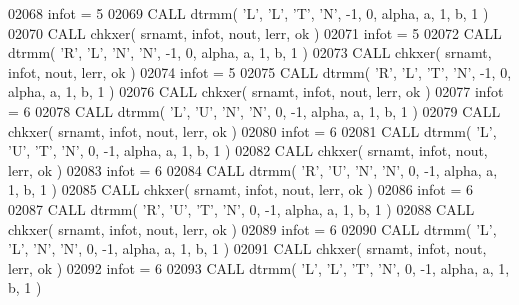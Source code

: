 \begin{DoxyCode}
02068       infot = 5
02069       \textcolor{keyword}{CALL }dtrmm( \textcolor{stringliteral}{'L'}, \textcolor{stringliteral}{'L'}, \textcolor{stringliteral}{'T'}, \textcolor{stringliteral}{'N'}, -1, 0, alpha, a, 1, b, 1 )
02070       \textcolor{keyword}{CALL }chkxer( srnamt, infot, nout, lerr, ok )
02071       infot = 5
02072       \textcolor{keyword}{CALL }dtrmm( \textcolor{stringliteral}{'R'}, \textcolor{stringliteral}{'L'}, \textcolor{stringliteral}{'N'}, \textcolor{stringliteral}{'N'}, -1, 0, alpha, a, 1, b, 1 )
02073       \textcolor{keyword}{CALL }chkxer( srnamt, infot, nout, lerr, ok )
02074       infot = 5
02075       \textcolor{keyword}{CALL }dtrmm( \textcolor{stringliteral}{'R'}, \textcolor{stringliteral}{'L'}, \textcolor{stringliteral}{'T'}, \textcolor{stringliteral}{'N'}, -1, 0, alpha, a, 1, b, 1 )
02076       \textcolor{keyword}{CALL }chkxer( srnamt, infot, nout, lerr, ok )
02077       infot = 6
02078       \textcolor{keyword}{CALL }dtrmm( \textcolor{stringliteral}{'L'}, \textcolor{stringliteral}{'U'}, \textcolor{stringliteral}{'N'}, \textcolor{stringliteral}{'N'}, 0, -1, alpha, a, 1, b, 1 )
02079       \textcolor{keyword}{CALL }chkxer( srnamt, infot, nout, lerr, ok )
02080       infot = 6
02081       \textcolor{keyword}{CALL }dtrmm( \textcolor{stringliteral}{'L'}, \textcolor{stringliteral}{'U'}, \textcolor{stringliteral}{'T'}, \textcolor{stringliteral}{'N'}, 0, -1, alpha, a, 1, b, 1 )
02082       \textcolor{keyword}{CALL }chkxer( srnamt, infot, nout, lerr, ok )
02083       infot = 6
02084       \textcolor{keyword}{CALL }dtrmm( \textcolor{stringliteral}{'R'}, \textcolor{stringliteral}{'U'}, \textcolor{stringliteral}{'N'}, \textcolor{stringliteral}{'N'}, 0, -1, alpha, a, 1, b, 1 )
02085       \textcolor{keyword}{CALL }chkxer( srnamt, infot, nout, lerr, ok )
02086       infot = 6
02087       \textcolor{keyword}{CALL }dtrmm( \textcolor{stringliteral}{'R'}, \textcolor{stringliteral}{'U'}, \textcolor{stringliteral}{'T'}, \textcolor{stringliteral}{'N'}, 0, -1, alpha, a, 1, b, 1 )
02088       \textcolor{keyword}{CALL }chkxer( srnamt, infot, nout, lerr, ok )
02089       infot = 6
02090       \textcolor{keyword}{CALL }dtrmm( \textcolor{stringliteral}{'L'}, \textcolor{stringliteral}{'L'}, \textcolor{stringliteral}{'N'}, \textcolor{stringliteral}{'N'}, 0, -1, alpha, a, 1, b, 1 )
02091       \textcolor{keyword}{CALL }chkxer( srnamt, infot, nout, lerr, ok )
02092       infot = 6
02093       \textcolor{keyword}{CALL }dtrmm( \textcolor{stringliteral}{'L'}, \textcolor{stringliteral}{'L'}, \textcolor{stringliteral}{'T'}, \textcolor{stringliteral}{'N'}, 0, -1, alpha, a, 1, b, 1 )

\end{DoxyCode}
